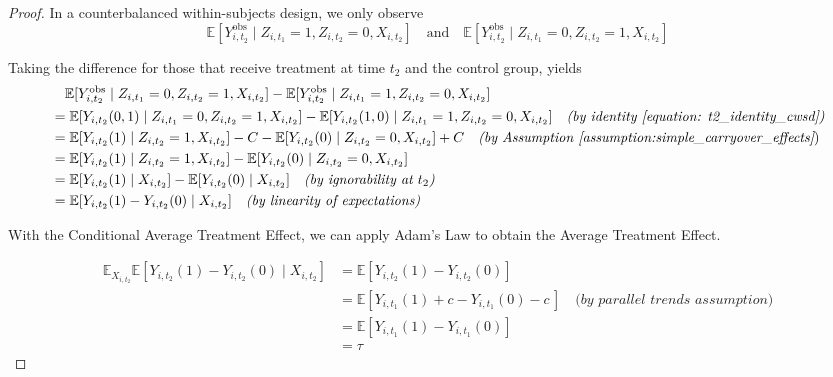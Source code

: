 \begin{proof}
    
    In a counterbalanced within-subjects design, we only observe \[\mathbb{E}[Y_{i,t_2}^{\text{obs}} \mid Z_{i,t_1} = 1, Z_{i,t_2} = 0, X_{i,t_2}] \quad \text{and} \quad \mathbb{E}[Y_{i,t_2}^{\text{obs}} \mid Z_{i,t_1} = 0, Z_{i,t_2} = 1, X_{i,t_2}]\] 

    Taking the difference for those that receive treatment at time $t_2$ and the control group, yields
    \[\begin{aligned}
        & \quad \mathbb{E}[Y_{i,t_2}^{\text{obs}} \mid Z_{i,t_1} = 0, Z_{i,t_2} = 1, X_{i,t_2}] - \mathbb{E}[Y_{i,t_2}^{\text{obs}} \mid Z_{i,t_1} = 1, Z_{i,t_2} = 0, X_{i,t_2}] \\
        &= \mathbb{E}[Y_{i,t_2}(0,1) \mid Z_{i,t_1} = 0, Z_{i,t_2} = 1, X_{i,t_2}] - \mathbb{E}[Y_{i,t_2}(1,0) \mid Z_{i,t_1} = 1, Z_{i,t_2} = 0, X_{i,t_2}] \quad \textit{(by identity \ref{equation: t2_identity_cwsd})} \\
        &= \mathbb{E}[Y_{i,t_2}(1) \mid Z_{i,t_2} = 1, X_{i,t_2}] - C - \mathbb{E}[Y_{i,t_2}(0) \mid  Z_{i,t_2} = 0, X_{i,t_2}] + C \quad \textit{(by Assumption \ref{assumption:simple_carryover_effects}}) \\
        &= \mathbb{E}[Y_{i,t_2}(1) \mid Z_{i,t_2} = 1, X_{i,t_2}] - \mathbb{E}[Y_{i,t_2}(0) \mid  Z_{i,t_2} = 0, X_{i,t_2}]  \\
        &= \mathbb{E}[Y_{i,t_2}(1) \mid X_{i,t_2}] - \mathbb{E}[Y_{i,t_2}(0) \mid  X_{i,t_2}] \quad \textit{(by ignorability at $t_2$)} \\
        &= \mathbb{E}[Y_{i,t_2}(1) - Y_{i,t_2}(0) \mid X_{i,t_2}] \quad \textit{(by linearity of expectations)} 
    \end{aligned}
    \] 

    With the Conditional Average Treatment Effect, we can apply Adam's Law to obtain the Average Treatment Effect.

    \[\begin{aligned}
        \mathbb{E}_{X_{i,t_2}}\mathbb{E}[Y_{i,t_2}(1) - Y_{i,t_2}(0) \mid X_{i,t_2}] 
        &= \mathbb{E}[Y_{i,t_2}(1) - Y_{i,t_2}(0)] \\
        &= \mathbb{E}[Y_{i,t_1}(1) + c - Y_{i,t_1}(0) - c\,] \quad \textit{(by parallel trends assumption)} \\
        &= \mathbb{E}[Y_{i,t_1}(1) - Y_{i,t_1}(0)]\\
        &= \tau
    \end{aligned}\]
\end{proof}

